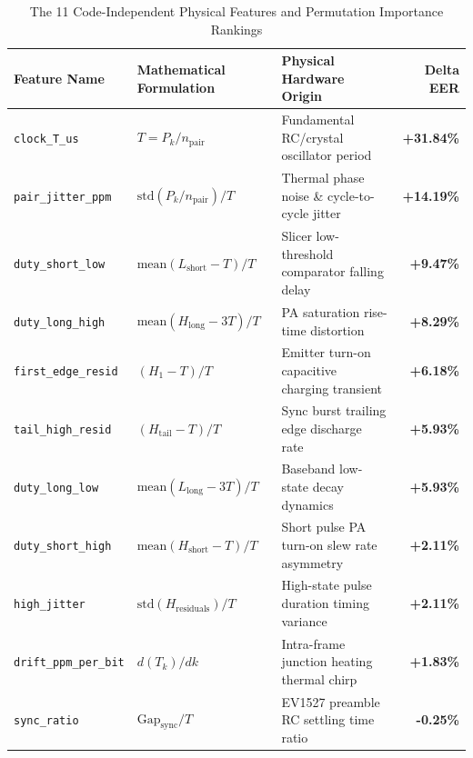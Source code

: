 \documentclass[11pt,a4paper]{article}
\begin{document}
\begin{table}[htbp]
\centering
\small
\caption{The 11 Code-Independent Physical Features and Permutation Importance Rankings}
\label{tab:features}
\begin{tabularx}{\textwidth}{l p{3.2cm} X r}
\toprule
\textbf{Feature Name} & \textbf{Mathematical Formulation} & \textbf{Physical Hardware Origin} & \textbf{Delta EER} \\
\midrule
\texttt{clock\_T\_us} & $T = P_k / n_{\text{pair}}$ & Fundamental RC/crystal oscillator period & \textbf{+31.84\%} \\
\texttt{pair\_jitter\_ppm} & $\text{std}(P_k / n_{\text{pair}}) / T$ & Thermal phase noise \& cycle-to-cycle jitter & \textbf{+14.19\%} \\
\texttt{duty\_short\_low} & $\text{mean}(L_{\text{short}} - T) / T$ & Slicer low-threshold comparator falling delay & \textbf{+9.47\%} \\
\texttt{duty\_long\_high} & $\text{mean}(H_{\text{long}} - 3T) / T$ & PA saturation rise-time distortion & \textbf{+8.29\%} \\
\texttt{first\_edge\_resid} & $(H_1 - T) / T$ & Emitter turn-on capacitive charging transient & \textbf{+6.18\%} \\
\texttt{tail\_high\_resid} & $(H_{\text{tail}} - T) / T$ & Sync burst trailing edge discharge rate & \textbf{+5.93\%} \\
\texttt{duty\_long\_low} & $\text{mean}(L_{\text{long}} - 3T) / T$ & Baseband low-state decay dynamics & \textbf{+5.93\%} \\
\texttt{duty\_short\_high} & $\text{mean}(H_{\text{short}} - T) / T$ & Short pulse PA turn-on slew rate asymmetry & \textbf{+2.11\%} \\
\texttt{high\_jitter} & $\text{std}(H_{\text{residuals}}) / T$ & High-state pulse duration timing variance & \textbf{+2.11\%} \\
\texttt{drift\_ppm\_per\_bit} & $d(T_k) / dk$ & Intra-frame junction heating thermal chirp & \textbf{+1.83\%} \\
\texttt{sync\_ratio} & $\text{Gap}_{\text{sync}} / T$ & EV1527 preamble RC settling time ratio & \textbf{-0.25\%} \\
\bottomrule
\end{tabularx}
\end{table}
\end{document}
